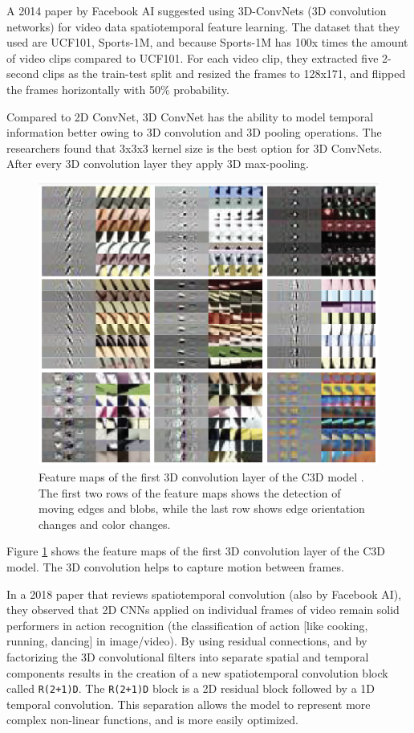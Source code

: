 A 2014 paper \cite{tran2015learning} by Facebook AI suggested using 3D-ConvNets (3D convolution networks) for video data spatiotemporal feature learning. The dataset that they used are UCF101, Sports-1M, and because Sports-1M has 100x times the amount of video clips compared to UCF101. For each video clip, they extracted five 2-second clips as the train-test split and resized the frames to 128x171, and flipped the frames horizontally with 50\% probability.

Compared to 2D ConvNet, 3D ConvNet has the ability to model temporal information better owing to 3D convolution and 3D pooling operations. The researchers found that 3x3x3 kernel size is the best option for 3D ConvNets. After every 3D convolution layer they apply 3D max-pooling.

\begin{figure}
    \centering
    \includegraphics[width=1\textwidth]{images/video_synthesis/c3d_feature_maps.png}
    \caption{Feature maps of the first 3D convolution layer of the C3D model \cite{tran2015learning}. The first two rows of the feature maps shows the detection of moving edges and blobs, while the last row shows edge orientation changes and color changes.}
    \label{fig:c3d_feature_maps}
\end{figure}

Figure \ref{fig:c3d_feature_maps} shows the feature maps of the first 3D convolution layer of the C3D model. The 3D convolution helps to capture motion between frames.

In a 2018 paper \cite{tran2018closer} that reviews spatiotemporal convolution (also by Facebook AI), they observed that 2D CNNs applied on individual frames of video remain solid performers in action recognition (the classification of action [like cooking, running, dancing] in image/video). By using residual connections, and by factorizing the 3D convolutional filters into separate spatial and temporal components results in the creation of a new spatiotemporal convolution block called \texttt{R(2+1)D}. The \texttt{R(2+1)D} block is a 2D residual block followed by a 1D temporal convolution. This separation allows the model to represent more complex non-linear functions, and is more easily optimized.


